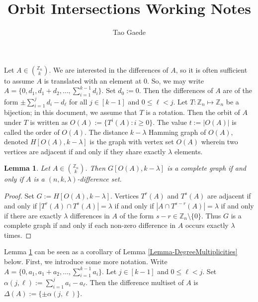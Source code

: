 \documentclass[12pt]{article}
\title{ \vspace{-3cm} Orbit Intersections Working Notes}
\author{Tao Gaede}
\newcommand{\Z}{\mathbb{Z}}
\newtheorem{lem}{Lemma} %
\theoremstyle{definition}
\begin{document}
	\maketitle
	
	Let $A \in {\Z_n \choose k}$.  We are interested in the differences of $A$, so it is often sufficient to assume $A$ is translated with an element at $0$.  So, we may write $A = \{0, d_1, d_1+d_2, \ldots, \sum_{i=1}^{k-1}d_i\}$.  Set $d_0 := 0$.  Then the differences of $A$ are of the form $\pm \sum_{i=1}^{j}d_i - d_\ell$ for all $j \in [k-1]$ and $0 \leq \ell < j$.  Let $T: \Z_n \mapsto \Z_n$ be a bijection; in this document, we assume that $T$ is a rotation.  Then the orbit of $A$ under $T$ is written as $O(A) := \{T^i(A): i \geq 0\}$.  The value $t := |O(A)|$ is called the order of $O(A)$.  The distance $k-\lambda$ Hamming graph of $O(A)$, denoted $H[O(A),k-\lambda]$ is the graph with vertex set $O(A)$ wherein two vertices are adjacent if and only if they share exactly $\lambda$ elements.
	
	\begin{lem}\label{Lemma-DifferenceSetsAreCliques}
		Let $A \in {\Z_n \choose k}$.  Then $G[O(A),k-\lambda]$ is a complete graph if and only if $A$ is a $(n,k,\lambda)$-difference set.
	\end{lem}
	\begin{proof}
		Set $G := H[O(A),k-\lambda]$.  Vertices $T^r(A)$ and $T^s(A)$ are adjacent if and only if $|T^r(A) \cap T^s(A)| = \lambda$ if and only if $|A \cap T^{s-r}(A)| = \lambda$ if and only if there are exactly $\lambda$ differences in $A$ of the form $s-r \in \Z_n \setminus \{0\}$.  Thus $G$ is a complete graph if and only if each non-zero difference in $A$ occurs exactly $\lambda$ times.  \qedhere
	\end{proof}
	
	Lemma \ref{Lemma-DifferenceSetsAreCliques} can be seen as a corollary of Lemma \ref{Lemma-DegreeMultiplicities} below.  First, we introduce some more notation.  Write $A = \{0, a_1, a_1+a_2, \ldots, \sum_{i=1}^{k-1}a_i\}$.  Let $j \in [k-1]$ and $0 \leq \ell < j$.  Set $\alpha(j,\ell) := \sum_{i=1}^{j}a_i - a_\ell$.  Then the difference multiset of $A$ is $\Delta(A) := \{\pm \alpha(j,\ell)\}$.
\end{document}
